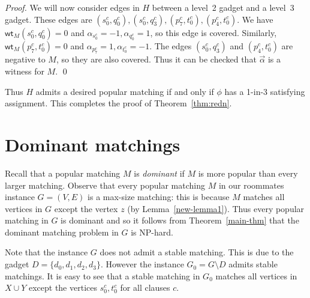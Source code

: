 \documentclass{llncs}
\newcommand{\wt}{\mathsf{wt}}
\begin{document}
\begin{proof}
   \smallskip
   
   We will now consider edges in $H$ between a level~2 gadget and a level~3 gadget. These edges are $(s^c_0,q^c_0), (s^c_0,q^c_3), (p^c_7,t^c_0), (p^c_4,t^c_0)$.
   We have $\wt_M(s^c_0,q^c_0) = 0$ and $\alpha_{s^c_0} = -1, \alpha_{q^c_0} = 1$, so this edge is covered. Similarly, $\wt_M(p^c_7,t^c_0) = 0$ and
   $\alpha_{p^c_7} = 1,\alpha_{t^c_0} = -1$.  The edges $(s^c_0,q^c_3)$ and $(p^c_4,t^c_0)$ are negative to $M$, so they are also covered.  Thus it can be checked
   that $\vec{\alpha}$ is a witness for $M$. \qed
\end{proof}

 Thus $H$ admits a desired popular matching if and only if $\phi$ has a 1-in-3 satisfying assignment.
 This completes the proof of Theorem~\ref{thm:redn}.

 \section{Dominant matchings}
\label{sec:domn}
    Recall that a popular matching $M$ is {\em dominant} if $M$ is more popular than every larger matching. 
  Observe that every popular  matching $M$ in our roommates instance $G = (V,E)$ is a max-size matching:
  this is because $M$ matches all vertices in $G$ except the vertex $z$ (by Lemma~\ref{new-lemma1}).
  Thus every popular  matching in $G$ is dominant and so it follows from Theorem~\ref{main-thm} that the dominant matching problem in $G$ is NP-hard.
  
  Note that the instance $G$ does not admit a stable matching. This is due to the gadget $D = \{d_0,d_1,d_2,d_3\}$.
  However the instance $G_0 = G \setminus D$ admits stable matchings. It is easy to see that a stable matching in $G_0$ matches all vertices in $X \cup Y$
  except the vertices $s^c_0,t^c_0$ for all clauses $c$.
  
\end{document}
